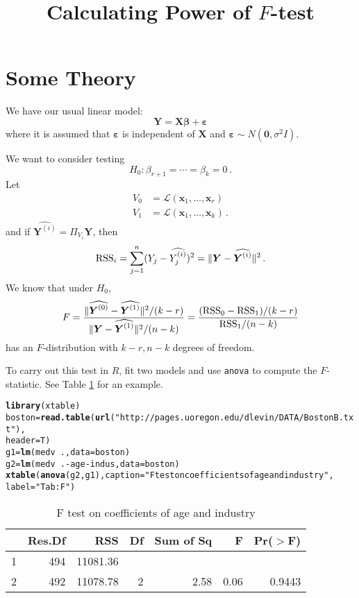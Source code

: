 \documentclass{amsart}\usepackage[]{graphicx}\usepackage[]{color}
\title{Calculating Power of $F$-test}
\makeatletter
\newcommand{\hlstr}[1]{\textcolor[rgb]{0.192,0.494,0.8}{#1}}%
\newcommand{\hlopt}[1]{\textcolor[rgb]{0,0,0}{#1}}%
\newcommand{\hlstd}[1]{\textcolor[rgb]{0.345,0.345,0.345}{#1}}%
\newcommand{\hlkwb}[1]{\textcolor[rgb]{0.69,0.353,0.396}{#1}}%
\newcommand{\hlkwc}[1]{\textcolor[rgb]{0.333,0.667,0.333}{#1}}%
\newcommand{\hlkwd}[1]{\textcolor[rgb]{0.737,0.353,0.396}{\textbf{#1}}}%
\newenvironment{kframe}{%
 \def\at@end@of@kframe{}%
 \ifinner\ifhmode%
  \def\at@end@of@kframe{\end{minipage}}%
  \begin{minipage}{\columnwidth}%
 \fi\fi%
 \def\FrameCommand##1{\hskip\@totalleftmargin \hskip-\fboxsep
 \colorbox{shadecolor}{##1}\hskip-\fboxsep
     \hskip-\linewidth \hskip-\@totalleftmargin \hskip\columnwidth}%
 \MakeFramed {\advance\hsize-\width
   \@totalleftmargin\z@ \linewidth\hsize
   \@setminipage}}%
 {\par\unskip\endMakeFramed%
 \at@end@of@kframe}
\newcommand{\ep}{\varepsilon}
\newcommand{\bvec}[1]{{\boldsymbol #1}}
\newcommand{\X}{\bvec{X}}
\newcommand{\x}{\bvec{x}}
\newcommand{\bbeta}{\bvec{\beta}}
\newcommand{\Lin}{{\mathcal L}}
\newcommand{\rss}{{\rm RSS}}
\theoremstyle{definition}
\makeatother
\begin{document}
\maketitle


\section{Some Theory}

We have our usual linear model:
\[
\bvec{Y} = \X \bbeta + \bvec{\ep}
\]
where it is assumed that $\bvec{\ep}$ is independent of
$\bvec{X}$ and $\bvec{\ep} \sim N(\bvec{0}, \sigma^2I)$.

We want to consider testing
\begin{equation} \label{Eq:Hy}
H_0 : \beta_{r+1} = \cdots = \beta_k = 0 \,.
\end{equation}
Let
\begin{align*}
  V_0 & = \Lin(\x_1,\ldots,\x_r) \\
  V_1 & = \Lin(\x_1,\ldots,\x_k) \,.
\end{align*}
and if $\widehat{\bvec{Y}^{(i)}} = \Pi_{V_i} \bvec{Y}$,
then
\[
\rss_i = \sum_{j=1}^n (Y_j - \widehat{Y_j^{(i)}})^2
= \| \bvec{Y} - \widehat{\bvec{Y}^{(i)}} \|^2 \,.
\]
We know that under $H_0$,
\[
F =
\frac{\|\widehat{\bvec{Y}^{(0)}} - \widehat{\bvec{Y}^{(1)}}\|^2/(k-r)}{\|\bvec{Y}-\widehat{\bvec{Y}^{(1)}}\|^2/(n-k)}
= \frac{(\rss_0 - \rss_1)/(k-r)}{\rss_1/(n-k)}
\]
has an $F$-distribution with $k-r,n-k$ degrees of freedom.

To carry out this test in $R$, fit two models and use
\verb|anova| to compute the $F$-statistic.  See
Table \ref{Tab:F} for an example.

\begin{kframe}
\begin{alltt}
\hlkwd{library}\hlstd{(xtable)}
\hlstd{boston} \hlkwb{=} \hlkwd{read.table}\hlstd{(}\hlkwd{url}\hlstd{(}\hlstr{"http://pages.uoregon.edu/dlevin/DATA/BostonB.txt"}\hlstd{),}
                    \hlkwc{header}\hlstd{=T)}
\hlstd{g1} \hlkwb{=} \hlkwd{lm}\hlstd{(medv}\hlopt{~}\hlstd{.,}\hlkwc{data}\hlstd{=boston)}
\hlstd{g2} \hlkwb{=} \hlkwd{lm}\hlstd{(medv}\hlopt{~}\hlstd{.}\hlopt{-}\hlstd{age}\hlopt{-}\hlstd{indus,}\hlkwc{data}\hlstd{=boston)}
\hlkwd{xtable}\hlstd{(}\hlkwd{anova}\hlstd{(g2,g1),}\hlkwc{caption}\hlstd{=}\hlstr{"F test on coefficients of age and industry"}\hlstd{,}
       \hlkwc{label}\hlstd{=}\hlstr{"Tab:F"}\hlstd{)}
\end{alltt}
\end{kframe}%
\begin{table}[ht]
\centering
\begin{tabular}{lrrrrrr}
  \hline
 & Res.Df & RSS & Df & Sum of Sq & F & Pr($>$F) \\ 
  \hline
1 & 494 & 11081.36 &  &  &  &  \\ 
  2 & 492 & 11078.78 & 2 & 2.58 & 0.06 & 0.9443 \\ 
   \hline
\end{tabular}
\caption{F test on coefficients of age and industry} 
\label{Tab:F}
\end{table}
\end{document}

